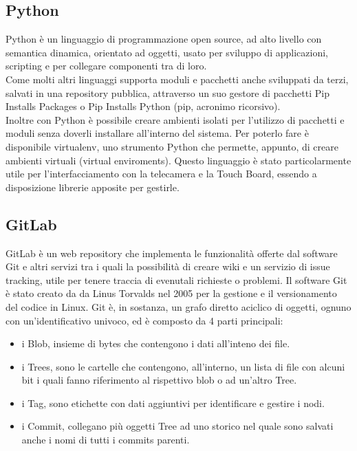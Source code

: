 \subsection{Python}
Python \`e un linguaggio di programmazione open source, ad alto livello con semantica dinamica, orientato ad oggetti, usato
per sviluppo di applicazioni, scripting e per collegare componenti tra di loro.\\[1\baselineskip]
Come molti altri linguaggi supporta moduli e pacchetti anche sviluppati da terzi, salvati in una repository pubblica,
attraverso un suo gestore di pacchetti Pip Installs Packages o Pip Installs Python (pip, acronimo ricorsivo).
\\[1\baselineskip]
Inoltre con Python \`e possibile creare ambienti isolati per l'utilizzo di pacchetti e moduli senza doverli installare all'interno del sistema.
Per poterlo fare \`e disponibile virtualenv, uno strumento Python che permette, appunto, di creare ambienti virtuali (virtual enviroments).
Questo linguaggio \`e stato particolarmente utile per l'interfacciamento con la telecamera e la Touch Board, essendo a disposizione librerie
apposite per gestirle.
\\[2\baselineskip]

\subsection{GitLab}
GitLab \`e un web repository che implementa le funzionalit\`a offerte dal software Git e altri
servizi tra i quali la possibilit\`a di creare wiki e un servizio di issue tracking, utile per tenere traccia
di evenutali richieste o problemi.
Il software Git \`e stato creato da da Linus Torvalds nel 2005 per la gestione e il versionamento del codice in Linux.
Git \`e, in sostanza, un grafo diretto aciclico di oggetti, ognuno con un'identificativo univoco, ed \`e composto da 4 parti principali:
\begin{itemize}
\item i Blob, insieme di bytes che contengono i dati all'inteno dei file.
\item i Trees, sono le cartelle che contengono, all'interno, un lista di file con alcuni bit i quali fanno riferimento al
rispettivo blob o ad un'altro Tree.
\item i Tag, sono etichette con dati aggiuntivi per identificare e gestire i nodi.
\item i Commit, collegano pi\`u oggetti Tree ad uno storico nel quale sono salvati anche i nomi di tutti i commits parenti.
\end{itemize}
